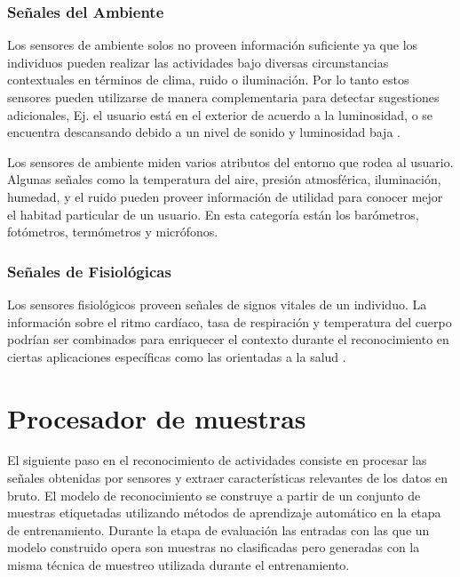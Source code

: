 \subsubsection{Señales del Ambiente}

Los sensores de ambiente solos no proveen información suficiente ya
que los individuos pueden realizar las actividades bajo diversas circunstancias
contextuales en términos de clima, ruido o iluminación. Por lo tanto
estos sensores pueden utilizarse de manera complementaria para detectar
sugestiones adicionales, Ej. el usuario está en el exterior de acuerdo
a la luminosidad, o se encuentra descansando debido a un nivel de
sonido y luminosidad baja \cite{LaraLabrador2013}.

Los sensores de ambiente miden varios atributos del entorno que rodea
al usuario. Algunas señales como la temperatura del aire, presión
atmosférica, iluminación, humedad, y el ruido pueden proveer información
de utilidad para conocer mejor el habitad particular de un usuario.
En esta categoría están los barómetros, fotómetros, termómetros y
micrófonos.

\subsubsection{Señales de Fisiológicas}

Los sensores fisiológicos proveen señales de signos vitales de un
individuo. La información sobre el ritmo cardíaco, tasa de respiración
y temperatura del cuerpo podrían ser combinados para enriquecer el
contexto durante el reconocimiento en ciertas aplicaciones específicas
como las orientadas a la salud \cite{LaraLabrador2013}.

\section{Procesador de muestras}

\label{sec44:proceso-se=0000F1ales}El siguiente paso en el reconocimiento
de actividades consiste en procesar las señales obtenidas por sensores
y extraer características relevantes de los datos en bruto. El modelo
de reconocimiento se construye a partir de un conjunto de muestras
etiquetadas utilizando métodos de aprendizaje automático en la etapa
de entrenamiento. Durante la etapa de evaluación las entradas con
las que un modelo construido opera son muestras no clasificadas pero
generadas con la misma técnica de muestreo utilizada durante el entrenamiento.

